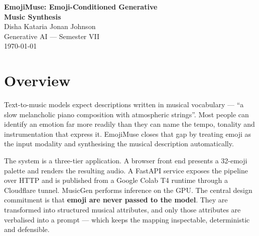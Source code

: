 \documentclass[11pt]{article}
\begin{document}
\begin{center}
    {\LARGE\bfseries EmojiMuse: Emoji-Conditioned Generative\\[2pt]
     Music Synthesis}\\[8pt]
    {\large Disha Kataria \quad\textbullet\quad Jonan Johnson}\\[3pt]
    {\small Generative AI --- Semester VII}\\[2pt]
    {\small\today}
\end{center}

\vspace{0.5em}

\begin{abstract}
\noindent
EmojiMuse converts a set of user-selected emoji into an original piece of
music. Rather than feeding emoji to a generative model directly, the system
interprets them as points in an eight-dimensional affective--musical space,
reduces a selection to a single \emph{reading}, renders that reading as a
natural-language prompt, and conditions Meta's MusicGen on the result. The
contribution is not a new model but a new \emph{conditioning interface}: a
compact, non-technical control surface over a text-to-music generator. This
report describes the models, the generation pipeline, the fusion methodology,
and a quantitative characterisation of the deployed system, including a
measured palette-coverage defect that the analysis exposed.
\end{abstract}

\section{Overview}

Text-to-music models expect descriptions written in musical vocabulary
--- ``a slow melancholic piano composition with atmospheric strings''.
Most people can identify an emotion far more readily than they can name the
tempo, tonality and instrumentation that express it. EmojiMuse closes that
gap by treating emoji as the input modality and synthesising the musical
description automatically.

The system is a three-tier application. A browser front end presents a
32-emoji palette and renders the resulting audio. A FastAPI service exposes
the pipeline over HTTP and is published from a Google Colab T4 runtime
through a Cloudflare tunnel. MusicGen performs inference on the GPU. The
central design commitment is that \textbf{emoji are never passed to the
model}. They are transformed into structured musical attributes, and only
those attributes are verbalised into a prompt --- which keeps the mapping
inspectable, deterministic and defensible.
\end{document}
